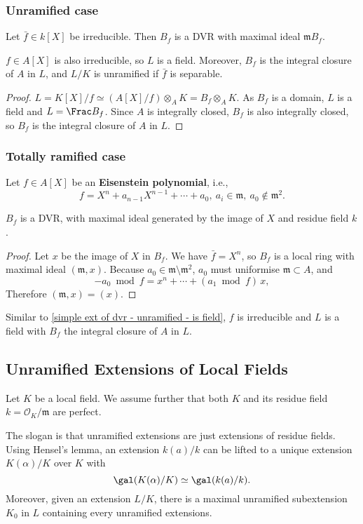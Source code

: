 \subsubsection*{Unramified case}
Let $\bar{f}\in k[X]$ be irreducible. Then $B_f$ is a DVR with maximal ideal $\mathfrak{m}B_f$.
\begin{corollary}\label{simple ext of dvr - unramified - is field}
    $f\in A[X]$ is also irreducible, so $L$ is a field.
    Moreover, $B_f$ is the integral closure of $A$ in $L$, and $L/K$ is unramified if $\bar{f}$ is separable.
\end{corollary}
\begin{proof}
    $L = K[X]/f \simeq \left( A[X]/f \right)\otimes_{A} K = B_f\otimes_A K$.
    As $B_f$ is a domain, $L$ is a field and $L = \Frac B_f$.
    Since $A$ is integrally closed, $B_f$ is also integrally closed, so $B_f$ is the integral closure of $A$ in $L$.
\end{proof}
\subsubsection*{Totally ramified case}
Let $f\in A[X]$ be an \textbf{Eisenstein polynomial}, i.e., \[f = X^n + a_{n-1}X^{n-1} + \cdots  + a_0,\ a_i\in\mathfrak{m},\ a_0\notin\mathfrak{m}^2.\]
\begin{proposition}
    $B_f$ is a DVR, with maximal ideal generated by the image of $X$ and residue field $k$.
\end{proposition}
\begin{proof}
    Let $x$ be the image of $X$ in $B_f$.
    We have $\bar{f} = X^n$, so $B_f$ is a local ring with maximal ideal $(\mathfrak{m}, x)$.
    Because $a_0\in\mathfrak{m\setminus m^2}$, $a_0$ must uniformise $\mathfrak{m}\subset A$, and \[-a_0\bmod f = x^n + \cdots + (a_1\bmod f)\,x,\] Therefore $(\mathfrak{m}, x) = (x)$.
\end{proof}
Similar to \cref{simple ext of dvr - unramified - is field}, $f$ is irreducible and $L$ is a field with $B_f$ the integral closure of $A$ in $L$.

\subsection{Unramified Extensions of Local Fields}
Let $K$ be a local field.
We assume further that both $K$ and its residue field $k = \mathcal{O}_K/\mathfrak{m}$ are perfect.

The slogan is that unramified extensions are just extensions of residue fields.
Using Hensel's lemma, an extension $k(a)/k$ can be lifted to a unique extension $K(\alpha)/K$ over $K$ with \[\gal(K(\alpha)/K)\simeq \gal(k(a)/k).\] Moreover, given an extension $L/K$, there is a maximal unramified subextension $K_0$ in $L$ containing every unramified extensions.

